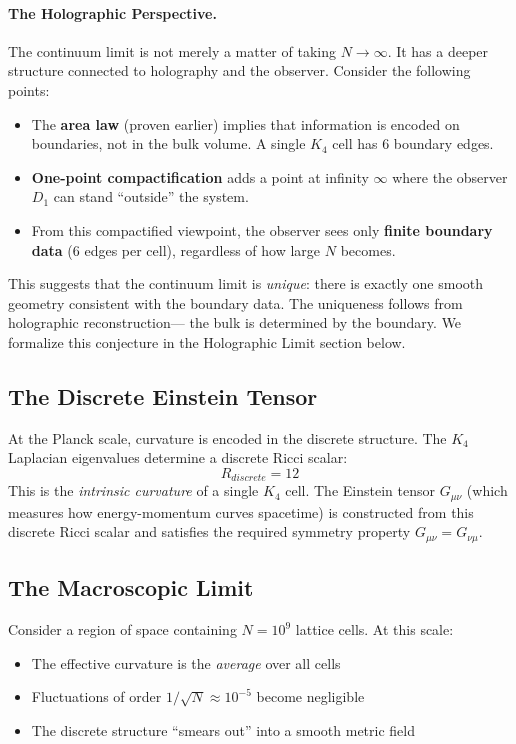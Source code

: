 \documentclass[11pt,a4paper]{book}
\def\text#1{#1}%
\begin{document}
\paragraph{The Holographic Perspective.}

The continuum limit is not merely a matter of taking $N \to \infty$. It has a deeper structure 
connected to holography and the observer. Consider the following points:

\begin{itemize}
\item The \textbf{area law} (proven earlier) implies that information is encoded on boundaries, 
not in the bulk volume. A single $K_4$ cell has 6 boundary edges.
\item \textbf{One-point compactification} adds a point at infinity $\infty$ where the observer 
$D_1$ can stand ``outside'' the system.
\item From this compactified viewpoint, the observer sees only \textbf{finite boundary data} 
(6 edges per cell), regardless of how large $N$ becomes.
\end{itemize}

This suggests that the continuum limit is \emph{unique}: there is exactly one smooth geometry 
consistent with the boundary data. The uniqueness follows from holographic reconstruction---
the bulk is determined by the boundary. We formalize this conjecture in the Holographic Limit 
section below.

\subsection{The Discrete Einstein Tensor}

At the Planck scale, curvature is encoded in the discrete structure. The $K_4$ Laplacian 
eigenvalues determine a discrete Ricci scalar:
\[
R_{\text{discrete}} = 12
\]
This is the \emph{intrinsic curvature} of a single $K_4$ cell. The Einstein tensor 
$G_{\mu\nu}$ (which measures how energy-momentum curves spacetime) is constructed from 
this discrete Ricci scalar and satisfies the required symmetry property $G_{\mu\nu} = G_{\nu\mu}$.

\subsection{The Macroscopic Limit}

Consider a region of space containing $N = 10^9$ lattice cells. At this scale:
\begin{itemize}
\item The effective curvature is the \emph{average} over all cells
\item Fluctuations of order $1/\sqrt{N} \approx 10^{-5}$ become negligible
\item The discrete structure ``smears out'' into a smooth metric field
\end{itemize}
\end{document}
